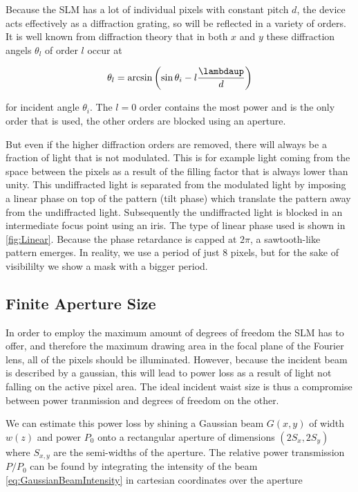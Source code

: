 Because the SLM has a lot of individual pixels with constant pitch $d$, the device acts effectively as a diffraction grating, so will be reflected in a variety of orders. 
It is well known from diffraction theory that in both $x$ and $y$ these diffraction angels $\theta_l$ of order $l$ occur at

\begin{equation}
    \theta_l = \arcsin\left(\sin\theta_i - l\frac{ \lambdaup}{d}\right)
\end{equation}

for incident angle $\theta_i$. 
The $l=0$ order contains the most power and is the only order that is used, the other orders are blocked using an aperture. 

But even if the higher diffraction orders are removed, there will always be a fraction of light that is not modulated. 
This is for example light coming from the space between the pixels as a result of the filling factor that is always lower than unity.
This undiffracted light is separated from the modulated light by imposing a linear phase on top of the pattern (tilt phase) which translate the pattern away from the undiffracted light.
Subsequently the undiffracted light is blocked in an intermediate focus point using an iris.
The type of linear phase used is shown in \cref{fig:Linear}.
Because the phase retardance is capped at $2\pi$, a sawtooth-like pattern emerges.
In reality, we use a period of just 8 pixels, but for the sake of visibililty we show a mask with a bigger period. 

\subsection{Finite Aperture Size}\label{subsec:ApertureSize}

In order to employ the maximum amount of degrees of freedom the SLM has to offer, and therefore the maximum drawing area in the focal plane of the Fourier lens, all of the pixels should be illuminated. 
However, because the incident beam is described by a gaussian, this will lead to power loss as a result of light not falling on the active pixel area. 
The ideal incident waist size is thus a compromise between power tranmission and degrees of freedom on the other.
    
We can estimate this power loss by shining a Gaussian beam $G(x,y)$ of width $w(z)$ and power $P_0$ onto a rectangular aperture of dimensions $(2S_x, 2S_y)$ where $S_{x,y}$ are the semi-widths of the aperture. 
The relative power transmission $P/P_0$ can be found by integrating the intensity of the beam \cref{eq:GaussianBeamIntensity} in cartesian coordinates over the aperture

